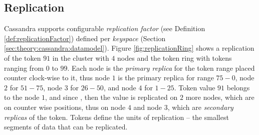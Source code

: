 \subsection{Replication}
Cassandra supports configurable \emph{replication factor} (see Definition \ref{def:replicationFactor}) defined per \emph{keyspace} (Section \ref{sec:theory:cassandra:datamodel}). Figure \ref{fig:replicationRing} shows a replication of the token $91$ in the cluster with $4$ nodes and the token ring with tokens ranging from $0$ to $99$. 
Each node is the \emph{primary replica} for the token range placed counter clock-wise to it, thus node $1$ is the primary replica for range $75-0$, node $2$ for $51-75$, node $3$ for $26-50$, and node $4$ for $1-25$. 
Token value $91$ belongs to the node $1$, and since , then the value is replicated on $2$ more nodes, which are on counter wise positions, thus on node $4$ and node $3$, which are \emph{secondary replicas} of the token. Tokens define the units of replication -- the smallest segments of data that can be replicated. 




  


